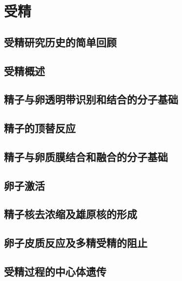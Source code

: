 \chapter{受精}

\section{受精研究历史的简单回顾}

\section{受精概述}

\section{精子与卵透明带识别和结合的分子基础}

\section{精子的顶替反应}

\section{精子与卵质膜结合和融合的分子基础}

\section{卵子激活}

\section{精子核去浓缩及雄原核的形成}

\section{卵子皮质反应及多精受精的阻止}

\section{受精过程的中心体遗传}

